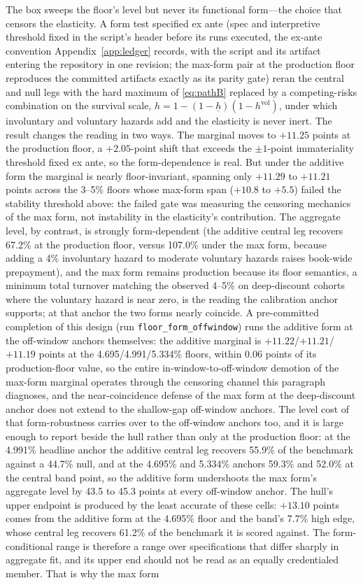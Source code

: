 \documentclass[12pt]{article}
\begin{document}
The box sweeps the floor's level but never its functional form---the choice that censors the elasticity. A form test specified ex ante (spec and interpretive threshold fixed in the script's header before its runs executed, the ex-ante convention Appendix~\ref{app:ledger} records, with the script and its artifact entering the repository in one revision; the max-form pair at the production floor reproduces the committed artifacts exactly as its parity gate) reran the central and null legs with the hard maximum of \eqref{eq:pathB} replaced by a competing-risks combination on the survival scale, $h = 1 - (1 - \underline{h})(1 - h^{\mathrm{vol}})$, under which involuntary and voluntary hazards add and the elasticity is never inert. The result changes the reading in two ways. The marginal moves to $+11.25$ points at the production floor, a $+2.05$-point shift that exceeds the $\pm 1$-point immateriality threshold fixed ex ante, so the form-dependence is real. But under the additive form the marginal is nearly floor-invariant, spanning only $+11.29$ to $+11.21$ points across the 3--5\% floors whose max-form span ($+10.8$ to $+5.5$) failed the stability threshold above: the failed gate was measuring the censoring mechanics of the max form, not instability in the elasticity's contribution. The aggregate level, by contrast, is strongly form-dependent (the additive central leg recovers 67.2\% at the production floor, versus 107.0\% under the max form, because adding a 4\% involuntary hazard to moderate voluntary hazards raises book-wide prepayment), and the max form remains production because its floor semantics, a minimum total turnover matching the observed 4--5\% on deep-discount cohorts where the voluntary hazard is near zero, is the reading the calibration anchor supports; at that anchor the two forms nearly coincide. A pre-committed completion of this design (run \texttt{floor\_form\_offwindow}) runs the additive form at the off-window anchors themselves: the additive marginal is $+11.22$/$+11.21$/$+11.19$ points at the 4.695/4.991/5.334\% floors, within 0.06 points of its production-floor value, so the entire in-window-to-off-window demotion of the max-form marginal operates through the censoring channel this paragraph diagnoses, and the near-coincidence defense of the max form at the deep-discount anchor does not extend to the shallow-gap off-window anchors. The level cost of that form-robustness carries over to the off-window anchors too, and it is large enough to report beside the hull rather than only at the production floor: at the 4.991\% headline anchor the additive central leg recovers 55.9\% of the benchmark against a 44.7\% null, and at the 4.695\% and 5.334\% anchors 59.3\% and 52.0\% at the central band point, so the additive form undershoots the max form's aggregate level by 43.5 to 45.3 points at every off-window anchor. The hull's upper endpoint is produced by the least accurate of these cells: $+13.10$ points comes from the additive form at the 4.695\% floor and the band's 7.7\% high edge, whose central leg recovers 61.2\% of the benchmark it is scored against. The form-conditional range is therefore a range over specifications that differ sharply in aggregate fit, and its upper end should not be read as an equally credentialed member. That is why the max form 
\end{document}
